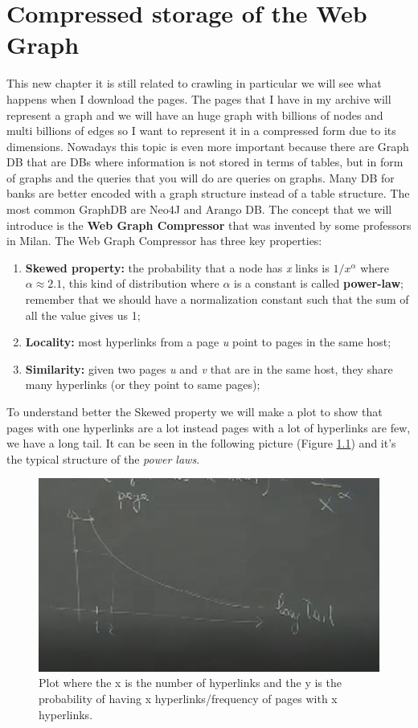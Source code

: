 \chapter{Compressed storage of the Web Graph}
This new chapter it is still related to crawling in particular we will see what happens when I download the pages.\newline
The pages that I have in my archive will represent a graph and we will have an huge graph with billions of nodes and multi billions of edges so I want to represent it in a compressed form due to its dimensions.\newline
Nowadays this topic is even more important because there are Graph DB that are DBs where information is not stored in terms of tables, but in form of graphs and the queries that you will do are queries on graphs. Many DB for banks are better encoded with a graph structure instead of a table structure. The most common GraphDB are Neo4J and Arango DB.\newline
The concept that we will introduce is the \textbf{Web Graph Compressor} that was invented by some professors in Milan.\newline
The Web Graph Compressor has three key properties:
\begin{enumerate}
    \item \textbf{Skewed property:} the probability that a node has \textit{x} links is $1/x^\alpha$ where $\alpha \approx 2.1$, this kind of distribution where $\alpha$ is a constant is called \textbf{power-law}; remember that we should have a normalization constant such that the sum of all the value gives us 1;
    \item \textbf{Locality:} most hyperlinks from a page \textit{u} point to pages in the same host; 
    \item \textbf{Similarity:} given two pages \textit{u} and \textit{v} that are in the same host, they share many hyperlinks (or they point to same pages);
\end{enumerate}
To understand better the Skewed property we will make a plot to show that pages with one hyperlinks are a lot instead pages with a lot of hyperlinks are few, we have a long tail. It can be seen in the following picture (Figure \ref{fig:powerlaw}) and it's the typical structure of the \textit{power laws}.
\begin{figure}
    \centering
    \includegraphics[width=0.75\linewidth]{images/powerlaw.png}
    \caption{Plot where the x is the number of hyperlinks and the y is the probability of having x hyperlinks/frequency of pages with x hyperlinks.}
    \label{fig:powerlaw}
\end{figure}
